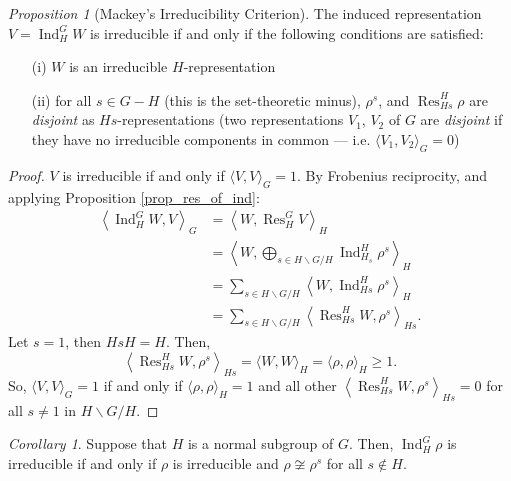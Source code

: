 \documentclass[a4paper]{report}
\theoremstyle{definition}
\theoremstyle{remark}
\theoremstyle{proposition}
\newtheorem{proposition}{Proposition}
\theoremstyle{conjecture}
\theoremstyle{lemma}
\theoremstyle{corollary}
\newtheorem{corollary}{Corollary}
\theoremstyle{exercise}
\theoremstyle{example}
\newcommand{\on}{\operatorname}
\begin{document}
\begin{proposition}[Mackey's Irreducibility Criterion]\label{thm_mackeys_thm}
    The induced representation $V = \on{Ind}_H^GW$ is irreducible if and only 
    if the following conditions are satisfied:
    \begin{itemize}
        \item[(i)] $W$ is an irreducible $H$-representation
        \item[(ii)] for all $s \in G -H$ (this is the set-theoretic
            minus), $\rho^s$, and $\on{Res}_{Hs}^H\rho$ are \emph{disjoint}
            as $Hs$-representations (two representations $V_1$, $V_2$ of 
            $G$ are \emph{disjoint} if they have no irreducible components 
            in common --- i.e. $\langle V_1,V_2\rangle_G = 0$)
    \end{itemize}
\end{proposition}

\begin{proof}
    $V$ is irreducible if and only if $\langle V,V\rangle_G = 1$.
    By Frobenius reciprocity, and applying Proposition \ref{prop_res_of_ind}:
    \begin{align*}
        \left\langle \on{Ind}_H^GW,V\right\rangle_G &= \left\langle W, \on{Res}_H^GV\right\rangle_H\\ &= \left\langle W, \bigoplus_{s \in H\backslash G/H}\on{Ind}_{H_s}^H \rho^s\right\rangle_H \\ 
                                                    &= \sum_{s \in H\backslash G/H} \left\langle W,\on{Ind}_{Hs}^H\rho^s\right\rangle_H\\
                                                    &= \sum_{s \in H\backslash G/H} \left\langle \on{Res}_{Hs}^HW,\rho^s\right\rangle_{Hs}.
    \end{align*} 
    Let $s=1$, then $HsH=H$. Then,
    $$\left\langle \on{Res}_{Hs}^H W, \rho^s\right\rangle_{Hs} = \langle W,W\rangle_H = \langle \rho,\rho\rangle_H \geq 1.$$
    So, $\langle V,V\rangle_G = 1$ if and only if $\langle \rho,\rho\rangle_H=1$
    and all other $\left\langle \on{Res}_{Hs}^HW,\rho^s\right\rangle_{Hs} = 0$
    for all $s\neq 1$ in $H \backslash G/H$.

\end{proof}

\begin{corollary}
    Suppose that $H$ is a normal subgroup of $G$. Then, 
    $\on{Ind}_H^G\rho$ is irreducible if and only if $\rho$ is irreducible 
    and $\rho \not\cong \rho^s$ for all $s\not\in H$.
\end{corollary}
\end{document}
